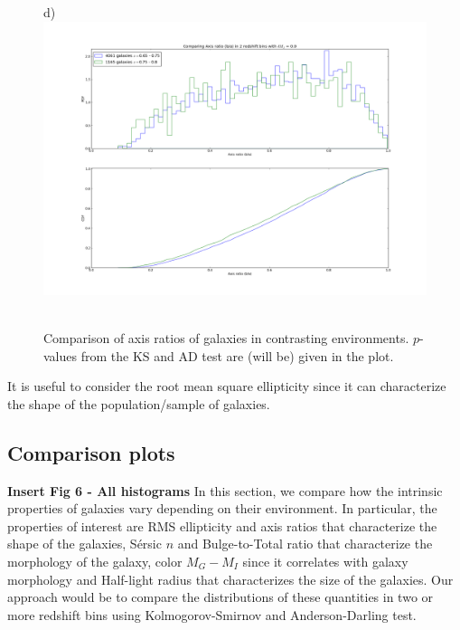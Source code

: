 \documentclass[twocolumn,useAMS,usenatbib]{mn2e}
\newcommand{\sersicn}{S\'{e}rsic $n$ }
\newcommand{\btt}{Bulge-to-Total }
\begin{document}
\begin{figure}
 d) \includegraphics[width=0.9\columnwidth]{axisratio(0)_0dot65-0dot75_0dot75-0dot8.png} \
 \caption{Comparison of axis ratios of galaxies in contrasting environments. $p$-values from the KS and AD test are (will be) given in the plot.}
 \label{fig:axisratio_contrasting}
\end{figure}


It is useful to consider the root mean square ellipticity since it can characterize the shape of the population/sample of galaxies.

\subsection{Comparison plots}

{\bf Insert Fig 6 - All histograms}
In this section, we compare how the intrinsic properties of galaxies vary depending on their environment. In particular, the properties of interest are RMS ellipticity and axis ratios that
characterize the shape of the galaxies, \sersicn and \btt ratio that characterize the morphology of the galaxy, color $M_G - M_I$ since it correlates with galaxy morphology
and Half-light radius that characterizes the size of the galaxies. Our approach would be to compare the distributions of these quantities in two or more redshift bins 
using Kolmogorov-Smirnov and Anderson-Darling test.
\end{document}
